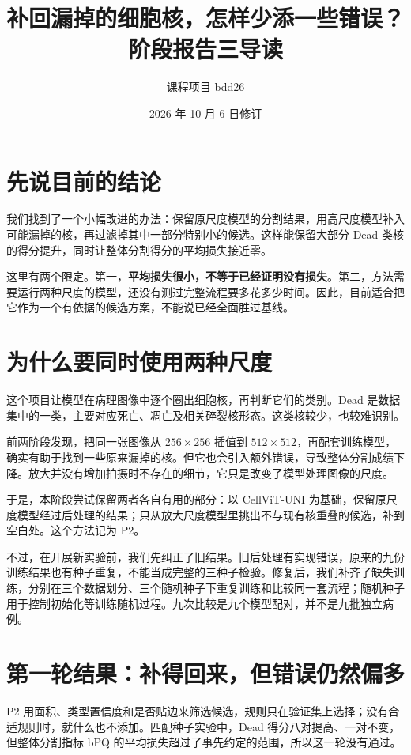 \documentclass[12pt,a4paper]{article}
\title{\bfseries 补回漏掉的细胞核，怎样少添一些错误？\\[7pt]
\large 阶段报告三导读}
\author{课程项目 bdd26}
\date{2026 年 10 月 6 日修订}
\begin{document}
\maketitle

\section*{先说目前的结论}

我们找到了一个小幅改进的办法：保留原尺度模型的分割结果，用高尺度模型补入可能漏掉的核，再过滤掉其中一部分特别小的候选。这样能保留大部分 Dead 类核的得分提升，同时让整体分割得分的平均损失接近零。

这里有两个限定。第一，\textbf{平均损失很小，不等于已经证明没有损失}。第二，方法需要运行两种尺度的模型，还没有测过完整流程要多花多少时间。因此，目前适合把它作为一个有依据的候选方案，不能说已经全面胜过基线。

\section*{为什么要同时使用两种尺度}

这个项目让模型在病理图像中逐个圈出细胞核，再判断它们的类别。Dead 是数据集中的一类，主要对应死亡、凋亡及相关碎裂核形态。这类核较少，也较难识别。

前两阶段发现，把同一张图像从 $256\times256$ 插值到 $512\times512$，再配套训练模型，确实有助于找到一些原来漏掉的核。但它也会引入额外错误，导致整体分割成绩下降。放大并没有增加拍摄时不存在的细节，它只是改变了模型处理图像的尺度。

于是，本阶段尝试保留两者各自有用的部分：以 CellViT-UNI 为基础，保留原尺度模型经过后处理的结果；只从放大尺度模型里挑出不与现有核重叠的候选，补到空白处。这个方法记为 P2。

不过，在开展新实验前，我们先纠正了旧结果。旧后处理有实现错误，原来的九份训练结果也有种子重复，不能当成完整的三种子检验。修复后，我们补齐了缺失训练，分别在三个数据划分、三个随机种子下重复训练和比较同一套流程；随机种子用于控制初始化等训练随机过程。九次比较是九个模型配对，并不是九批独立病例。

\section*{第一轮结果：补得回来，但错误仍然偏多}

P2 用面积、类型置信度和是否贴边来筛选候选，规则只在验证集上选择；没有合适规则时，就什么也不添加。匹配种子实验中，Dead 得分八对提高、一对不变，但整体分割指标 bPQ 的平均损失超过了事先约定的范围，所以这一轮没有通过。
\end{document}
